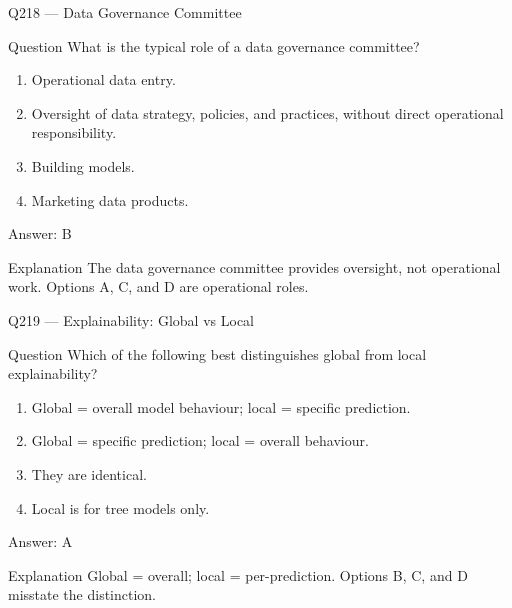 \documentclass[aspectratio=169,8pt]{beamer}
\begin{document}
																									\begin{frame}{Q218 --- Data Governance Committee}
																										\begin{block}{Question}
																											What is the typical role of a data governance committee?
																											\begin{enumerate}
																												\item Operational data entry.
																												\item Oversight of data strategy, policies, and practices, without direct operational responsibility.
																												\item Building models.
																												\item Marketing data products.
																											\end{enumerate}  \end{block}
																											\begin{exampleblock}{Answer: B}\end{exampleblock}
																											\begin{block}{Explanation}
																												The data governance committee provides oversight, not operational work. Options A, C, and D are operational roles.
																											\end{block}
																										\end{frame}
																										
																										\begin{frame}{Q219 --- Explainability: Global vs Local}
																											\begin{block}{Question}
																												Which of the following best distinguishes global from local explainability?
																												\begin{enumerate}
																													\item Global = overall model behaviour; local = specific prediction.
																													\item Global = specific prediction; local = overall behaviour.
																													\item They are identical.
																													\item Local is for tree models only.
																												\end{enumerate}  \end{block}
																												\begin{exampleblock}{Answer: A}\end{exampleblock}
																												\begin{block}{Explanation}
																													Global = overall; local = per-prediction. Options B, C, and D misstate the distinction.
																												\end{block}
																											\end{frame}
																											
\end{document}
